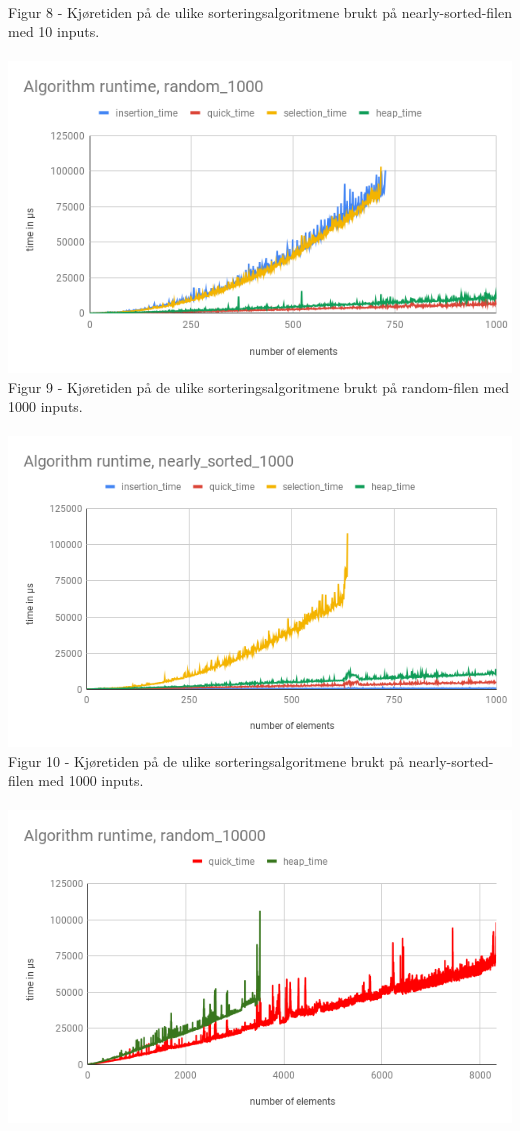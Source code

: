 \documentclass[a4paper, article, oneside, norsk]{memoir} %
\newcommand{\0}{\mathbf{0}}
\newcommand{\1}{\mathbf{1}}
\begin{document}
\\
Figur 8 - Kjøretiden på de ulike sorteringsalgoritmene brukt på nearly-sorted-filen med 10 inputs.
\\
\\
\includegraphics[scale=0.65]{Algorithm runtime.png}
\\
Figur 9 - Kjøretiden på de ulike sorteringsalgoritmene brukt på random-filen med 1000 inputs.
\\
\\
\includegraphics[scale=0.65]{Algorithm runtime_near.png}
\\
Figur 10 - Kjøretiden på de ulike sorteringsalgoritmene brukt på nearly-sorted-filen med 1000 inputs.
\\
\\
\includegraphics[scale=0.65]{Algorithm runtime, random_10000.png}
\end{document}
